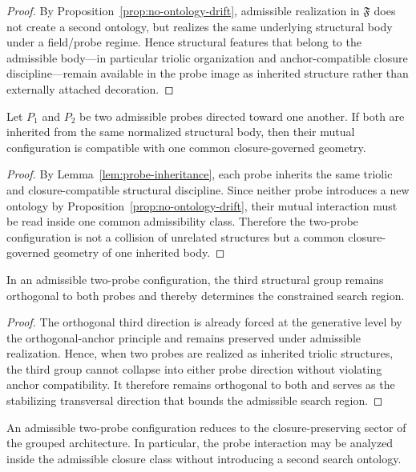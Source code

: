 \begin{proof}
By Proposition~\ref{prop:no-ontology-drift}, admissible realization in
$\mathfrak F$ does not create a second ontology, but realizes the same
underlying structural body under a field/probe regime. Hence structural features
that belong to the admissible body---in particular triolic organization and
anchor-compatible closure discipline---remain available in the probe image as
inherited structure rather than externally attached decoration.
\end{proof}

\begin{lemma}
\label{lem:two-probe-compatibility}
Let $P_1$ and $P_2$ be two admissible probes directed toward one another. If
both are inherited from the same normalized structural body, then their mutual
configuration is compatible with one common closure-governed geometry.
\end{lemma}

\begin{proof}
By Lemma~\ref{lem:probe-inheritance}, each probe inherits the same triolic and
closure-compatible structural discipline. Since neither probe introduces a new
ontology by Proposition~\ref{prop:no-ontology-drift}, their mutual interaction
must be read inside one common admissibility class. Therefore the two-probe
configuration is not a collision of unrelated structures but a common
closure-governed geometry of one inherited body.
\end{proof}

\begin{lemma}
\label{lem:orthogonal-third-group-probe}
In an admissible two-probe configuration, the third structural group remains
orthogonal to both probes and thereby determines the constrained search region.
\end{lemma}

\begin{proof}
The orthogonal third direction is already forced at the generative level by the
orthogonal-anchor principle and remains preserved under admissible realization.
Hence, when two probes are realized as inherited triolic structures, the third
group cannot collapse into either probe direction without violating anchor
compatibility. It therefore remains orthogonal to both and serves as the
stabilizing transversal direction that bounds the admissible search region.
\end{proof}

\begin{proposition}
\label{prop:probe-reduction-theorem}
An admissible two-probe configuration reduces to the closure-preserving sector of
the grouped architecture. In particular, the probe interaction may be analyzed
inside the admissible closure class without introducing a second search
ontology.
\end{proposition}

